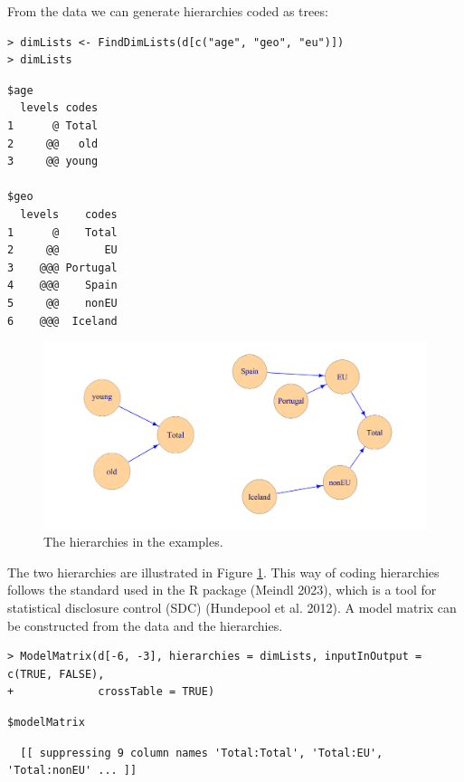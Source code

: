 From the data we can generate hierarchies coded as trees:

\begin{verbatim}
> dimLists <- FindDimLists(d[c("age", "geo", "eu")])
> dimLists 
\end{verbatim}

\begin{verbatim}
$age
  levels codes
1      @ Total
2     @@   old
3     @@ young

$geo
  levels    codes
1      @    Total
2     @@       EU
3    @@@ Portugal
4    @@@    Spain
5     @@    nonEU
6    @@@  Iceland
\end{verbatim}

\begin{figure}
\includegraphics[width=1\linewidth]{figures/young_old_EU_nonEU_Total} \caption{The hierarchies in the examples.}\label{fig:fig1}
\end{figure}

The two hierarchies are illustrated in Figure \ref{fig:fig1}.
This way of coding hierarchies follows the standard used in the R package  (Meindl 2023),
which is a tool for statistical disclosure control (SDC) (Hundepool et al. 2012).
A model matrix can be constructed from the data and the hierarchies.

\begin{verbatim}
> ModelMatrix(d[-6, -3], hierarchies = dimLists, inputInOutput = c(TRUE, FALSE), 
+             crossTable = TRUE)
\end{verbatim}

\begin{verbatim}
$modelMatrix
\end{verbatim}

\begin{verbatim}
  [[ suppressing 9 column names 'Total:Total', 'Total:EU', 'Total:nonEU' ... ]]
\end{verbatim}

